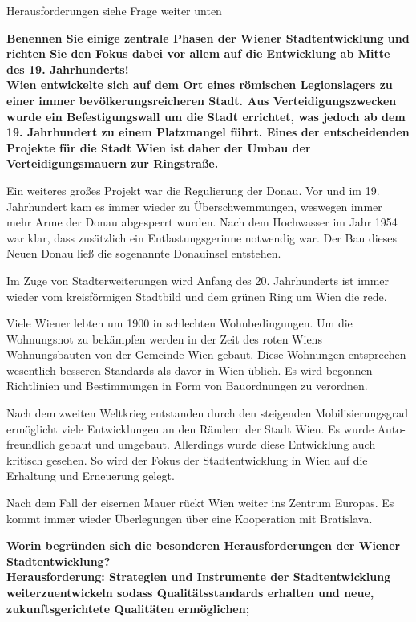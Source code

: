 \documentclass[]{article}
\newenvironment{question}{\vspace{8mm}\noindent\bfseries}{\\}
\begin{document}
Herausforderungen siehe Frage weiter unten

\begin{question}
	Benennen Sie einige zentrale Phasen der Wiener Stadtentwicklung und richten Sie den Fokus dabei vor allem auf die Entwicklung ab Mitte des 19. Jahrhunderts!
\end{question}
Wien entwickelte sich auf dem Ort eines römischen Legionslagers zu einer immer bevölkerungsreicheren Stadt. Aus Verteidigungszwecken wurde ein Befestigungswall um die Stadt errichtet, was jedoch ab dem 19. Jahrhundert zu einem Platzmangel führt. Eines der entscheidenden Projekte für die Stadt Wien ist daher der Umbau der Verteidigungsmauern zur Ringstraße.

Ein weiteres großes Projekt war die Regulierung der Donau. Vor und im 19. Jahrhundert kam es immer wieder zu Überschwemmungen, weswegen immer mehr Arme der Donau abgesperrt wurden. Nach dem Hochwasser im Jahr 1954 war klar, dass zusätzlich ein Entlastungsgerinne notwendig war. Der Bau dieses Neuen Donau ließ die sogenannte Donauinsel entstehen.

Im Zuge von Stadterweiterungen wird Anfang des 20. Jahrhunderts ist immer wieder vom kreisförmigen Stadtbild und dem grünen Ring um Wien die rede.

Viele Wiener lebten um 1900 in schlechten Wohnbedingungen. Um die Wohnungsnot zu bekämpfen werden in der Zeit des roten Wiens Wohnungsbauten von der Gemeinde Wien gebaut. Diese Wohnungen entsprechen wesentlich besseren Standards als davor in Wien üblich. Es wird begonnen Richtlinien und Bestimmungen in Form von Bauordnungen zu verordnen.

Nach dem zweiten Weltkrieg entstanden durch den steigenden Mobilisierungsgrad ermöglicht viele Entwicklungen an den Rändern der Stadt Wien. Es wurde Auto-freundlich gebaut und umgebaut. Allerdings wurde diese Entwicklung auch kritisch gesehen. So wird der Fokus der Stadtentwicklung in Wien auf die Erhaltung und Erneuerung gelegt.

Nach dem Fall der eisernen Mauer rückt Wien weiter ins Zentrum Europas. Es kommt immer wieder Überlegungen über eine Kooperation mit Bratislava.

\begin{question}
	Worin begründen sich die besonderen Herausforderungen der Wiener Stadtentwicklung?
\end{question}
Herausforderung: Strategien und Instrumente der Stadtentwicklung weiterzuentwickeln sodass Qualitätsstandards erhalten und neue, zukunftsgerichtete Qualitäten ermöglichen;
\end{document}

